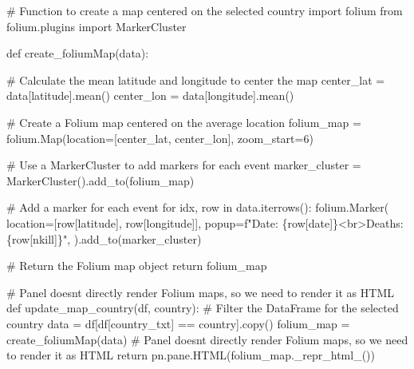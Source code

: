 \documentclass[
  letterpaper,
  DIV=11,
  numbers=noendperiod]{scrreprt}
\newenvironment{Shaded}{\begin{snugshade}}{\end{snugshade}}
\newcommand{\CommentTok}[1]{\textcolor[rgb]{0.37,0.37,0.37}{#1}}
\newcommand{\ControlFlowTok}[1]{\textcolor[rgb]{0.00,0.23,0.31}{#1}}
\newcommand{\DecValTok}[1]{\textcolor[rgb]{0.68,0.00,0.00}{#1}}
\newcommand{\ImportTok}[1]{\textcolor[rgb]{0.00,0.46,0.62}{#1}}
\newcommand{\KeywordTok}[1]{\textcolor[rgb]{0.00,0.23,0.31}{#1}}
\newcommand{\NormalTok}[1]{\textcolor[rgb]{0.00,0.23,0.31}{#1}}
\newcommand{\OperatorTok}[1]{\textcolor[rgb]{0.37,0.37,0.37}{#1}}
\newcommand{\SpecialCharTok}[1]{\textcolor[rgb]{0.37,0.37,0.37}{#1}}
\newcommand{\SpecialStringTok}[1]{\textcolor[rgb]{0.13,0.47,0.30}{#1}}
\newcommand{\StringTok}[1]{\textcolor[rgb]{0.13,0.47,0.30}{#1}}
\begin{document}
\begin{Shaded}
\begin{Highlighting}[]
\CommentTok{\# Function to create a map centered on the selected country}
\ImportTok{import}\NormalTok{ folium}
\ImportTok{from}\NormalTok{ folium.plugins }\ImportTok{import}\NormalTok{ MarkerCluster}

\KeywordTok{def}\NormalTok{ create\_foliumMap(data):}

    \CommentTok{\# Calculate the mean latitude and longitude to center the map}
\NormalTok{    center\_lat }\OperatorTok{=}\NormalTok{ data[}\StringTok{\textquotesingle{}latitude\textquotesingle{}}\NormalTok{].mean()}
\NormalTok{    center\_lon }\OperatorTok{=}\NormalTok{ data[}\StringTok{\textquotesingle{}longitude\textquotesingle{}}\NormalTok{].mean()}

    \CommentTok{\# Create a Folium map centered on the average location}
\NormalTok{    folium\_map }\OperatorTok{=}\NormalTok{ folium.Map(location}\OperatorTok{=}\NormalTok{[center\_lat, center\_lon], zoom\_start}\OperatorTok{=}\DecValTok{6}\NormalTok{)}

    \CommentTok{\# Use a MarkerCluster to add markers for each event}
\NormalTok{    marker\_cluster }\OperatorTok{=}\NormalTok{ MarkerCluster().add\_to(folium\_map)}

    \CommentTok{\# Add a marker for each event}
    \ControlFlowTok{for}\NormalTok{ idx, row }\KeywordTok{in}\NormalTok{ data.iterrows():}
\NormalTok{        folium.Marker(}
\NormalTok{            location}\OperatorTok{=}\NormalTok{[row[}\StringTok{\textquotesingle{}latitude\textquotesingle{}}\NormalTok{], row[}\StringTok{\textquotesingle{}longitude\textquotesingle{}}\NormalTok{]],}
\NormalTok{            popup}\OperatorTok{=}\SpecialStringTok{f"Date: }\SpecialCharTok{\{}\NormalTok{row[}\StringTok{\textquotesingle{}date\textquotesingle{}}\NormalTok{]}\SpecialCharTok{\}}\SpecialStringTok{\textless{}br\textgreater{}Deaths: }\SpecialCharTok{\{}\NormalTok{row[}\StringTok{\textquotesingle{}nkill\textquotesingle{}}\NormalTok{]}\SpecialCharTok{\}}\SpecialStringTok{"}\NormalTok{,}
\NormalTok{        ).add\_to(marker\_cluster)}

    \CommentTok{\# Return the Folium map object}
    \ControlFlowTok{return}\NormalTok{ folium\_map}
    
\CommentTok{\# Panel doesn\textquotesingle{}t directly render Folium maps, so we need to render it as HTML}
\KeywordTok{def}\NormalTok{ update\_map\_country(df, country):}
    \CommentTok{\# Filter the DataFrame for the selected country}
\NormalTok{    data }\OperatorTok{=}\NormalTok{ df[df[}\StringTok{\textquotesingle{}country\_txt\textquotesingle{}}\NormalTok{] }\OperatorTok{==}\NormalTok{ country].copy()}
\NormalTok{    folium\_map }\OperatorTok{=}\NormalTok{ create\_foliumMap(data)}
    \CommentTok{\# Panel doesn\textquotesingle{}t directly render Folium maps, so we need to render it as HTML}
    \ControlFlowTok{return}\NormalTok{ pn.pane.HTML(folium\_map.\_repr\_html\_())}
    

\end{Highlighting}
\end{Shaded}
\end{document}
